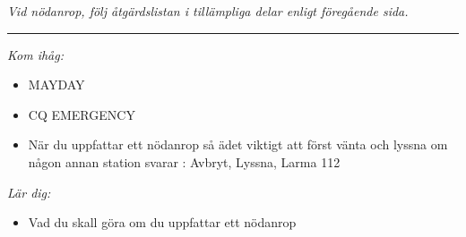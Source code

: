 \textit{Vid nödanrop, följ åtgärdslistan i tillämpliga delar enligt
  föregående sida.} \\[1em] \hrule

\emph{Kom ihåg:}

\begin{itemize}
\item MAYDAY
\item CQ EMERGENCY
\item När du uppfattar ett nödanrop så ädet viktigt att först vänta och
  lyssna om någon annan station svarar
  : Avbryt, Lyssna, Larma 112
\end{itemize}

\emph{Lär dig:}

\begin{itemize}
\item  Vad du skall göra om du uppfattar ett nödanrop
\end{itemize}
